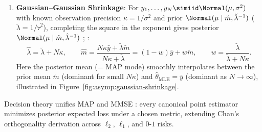 \documentclass[../../../../master.tex]{subfiles}
\begin{document}
\begin{coremath}
\begin{enumerate}
\begin{equation}
  \end{equation}
  reducing at $\alpha = \beta = 1$ to $\hat{\theta}_{\mathrm{MAP}} = \hat{\theta}_{\mathrm{MLE}} = N_1/N$ while the posterior predictive yields Laplace's rule of succession $\frac{N_1 + 1}{N + 2}$ even under a uniform prior.
  \item \textbf{Gaussian--Gaussian Shrinkage}: For $y_1,\dots,y_N \simiid \Normal(\mu, \sigma^2)$ with known observation precision $\kappa = 1/\sigma^2$ and prior $\Normal(\mu \mid \breve{m}, \breve{\lambda}^{-1})$ ($\breve{\lambda} = 1/\breve{\tau}^2$), completing the square in the exponent gives posterior $\Normal(\mu \mid \hat{m}, \hat{\lambda}^{-1})$ ; :
  \begin{equation}
  \label{eq:asymp:gauss-shrink}
  \hat{\lambda} = \breve{\lambda} + N\kappa, \qquad \hat{m} = \frac{N\kappa \bar{y} + \breve{\lambda}\breve{m}}{N\kappa + \breve{\lambda}} = (1 - w)\bar{y} + w\breve{m}, \qquad w = \frac{\breve{\lambda}}{\breve{\lambda} + N\kappa}.
  \end{equation}
  Here the posterior mean (= MAP mode) smoothly interpolates between the prior mean $\breve{m}$ (dominant for small $N\kappa$) and $\hat{\theta}_{\mathrm{MLE}} = \bar{y}$ (dominant as $N \to \infty$), illustrated in Figure~\ref{fig:asymp:gaussian-shrinkage}.
\end{enumerate}
\end{coremath}


Decision theory unifies MAP and MMSE : every canonical point estimator minimizes posterior expected loss under a chosen metric, extending Chan's orthogonality derivation  across $\ell_2$, $\ell_1$, and $0\text{-}1$ risks.
\end{document}

